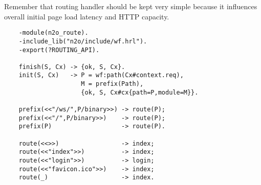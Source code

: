 Remember that routing handler should be kept very simple because it
influences overall initial page load latency and HTTP capacity.

\vspace{1\baselineskip}
\begin{lstlisting}
    -module(n2o_route).
    -include_lib("n2o/include/wf.hrl").
    -export(?ROUTING_API).

    finish(S, Cx) -> {ok, S, Cx}.
    init(S, Cx)   -> P = wf:path(Cx#context.req),
                     M = prefix(Path),
                     {ok, S, Cx#cx{path=P,module=M}}.

    prefix(<<"/ws/",P/binary>>) -> route(P);
    prefix(<<"/",P/binary>>)    -> route(P);
    prefix(P)                   -> route(P).

    route(<<>>)                 -> index;
    route(<<"index">>)          -> index;
    route(<<"login">>)          -> login;
    route(<<"favicon.ico">>)    -> index;
    route(_)                    -> index.
\end{lstlisting}
